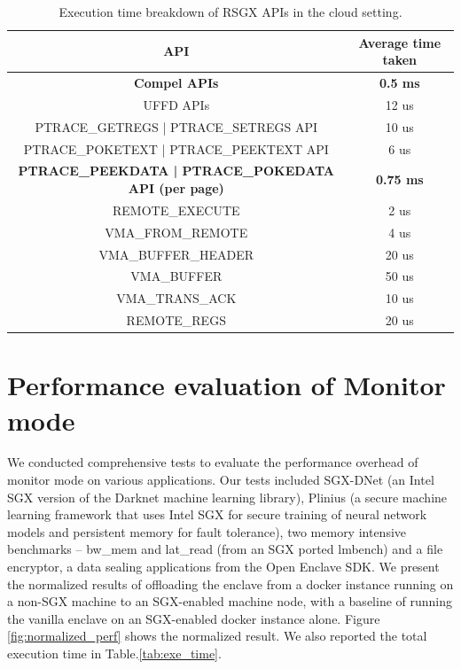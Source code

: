 \documentclass[article, doublespace,nopageskip]{VTthesis} %
\newcommand{\monitor}{RSGX \xspace}
\begin{document}
    \begin{table}[t]
    \centering
    \footnotesize
    \caption{Execution time breakdown of \monitor APIs in the cloud setting.}
    \begin{tabular}{| c | c |} \hline
          API & Average time taken \\ \hline \hline
        \textbf{Compel APIs}  &  \textbf{0.5 ms}\\ \hline
        UFFD APIs &  12 us \\ \hline
        PTRACE\_GETREGS | PTRACE\_SETREGS API  &  10 us\\  \hline
        PTRACE\_POKETEXT | PTRACE\_PEEKTEXT API & 6 us\\ \hline
        \textbf{PTRACE\_PEEKDATA | PTRACE\_POKEDATA API (per page)} & \textbf{0.75 ms} \\ \hline 
        REMOTE\_EXECUTE & 2 us \\ \hline
        VMA\_FROM\_REMOTE & 4 us \\ \hline
        VMA\_BUFFER\_HEADER & 20 us \\ \hline
        VMA\_BUFFER & 50 us \\ \hline
        VMA\_TRANS\_ACK & 10 us \\ \hline
        REMOTE\_REGS & 20 us \\ \hline
    \end{tabular}
    \label{t:TimeConsumingCalls}
    \end{table}
    
    \section{Performance evaluation of Monitor mode} \label{ase:performance evaluation of monitor mode}
    We conducted comprehensive tests to evaluate the performance overhead of monitor mode on various applications. Our tests included SGX-DNet (an Intel SGX version of the Darknet machine learning library), Plinius (a secure machine learning framework that uses Intel SGX for secure training of neural network models and persistent memory for fault tolerance), two memory intensive benchmarks – bw\_mem and lat\_read (from an SGX ported lmbench) and a file encryptor, a data sealing applications from the Open Enclave SDK. We present the normalized results of offloading the enclave from a docker instance running on a non-SGX machine to an SGX-enabled machine node, with a baseline of running the vanilla enclave on an SGX-enabled docker instance alone. Figure \ref{fig:normalized_perf}  shows the normalized result. We also reported the total execution time in Table.\ref{tab:exe_time}.
\end{document}
